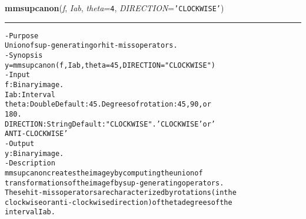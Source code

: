     \begin{boxedminipage}{\textwidth}

    \raggedright \textbf{mmsupcanon}(\textit{f}, \textit{Iab}, \textit{theta}=\texttt{4\-}, \textit{DIRECTION}=\texttt{'\-C\-L\-O\-C\-K\-W\-I\-S\-E\-'\-})

    \vspace{-1.5ex}

    \rule{\textwidth}{0.5\fboxrule}
\begin{alltt}
- Purpose
    Union of sup-generating or hit-miss operators.
- Synopsis
    y = mmsupcanon(f, Iab, theta=45, DIRECTION="CLOCKWISE")
- Input
    f:         Binary image.
    Iab:       Interval
    theta:     Double Default: 45. Degrees of rotation: 45, 90, or
               180.
    DIRECTION: String Default: "CLOCKWISE". 'CLOCKWISE' or '
               ANTI-CLOCKWISE'
- Output
    y: Binary image.
- Description
    mmsupcanon creates the image y by computing the union of
    transformations of the image f by sup-generating operators.
    These hit-miss operators are characterized by rotations (in the
    clockwise or anti-clockwise direction) of theta degrees of the
    interval Iab .\end{alltt}

    \vspace{1ex}

    \end{boxedminipage}

    \label{multireg:num_pymorph:mmsupgen}
    \vspace{0.5ex}

